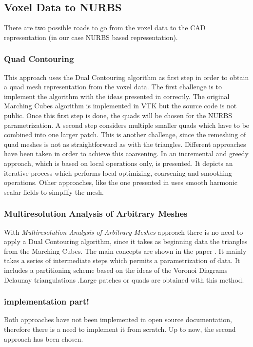 
\subsection{Voxel Data to NURBS}
There are two possible roads to go from the voxel data to the CAD representation (in our case NURBS based representation).
\subsubsection{Quad Contouring}
This approach uses the Dual Contouring algorithm as first step in order to obtain a quad mesh representation from the voxel data. The first challenge is to implement the algorithm with the ideas presented in \cite{Hermite2002} correctly. The original Marching Cubes algorithm is implemented in VTK but the source code is not public. Once this first step is done, the quads will be chosen for the NURBS parametrization. A second step considers multiple smaller quads which have to be combined into one larger patch. This is another challenge, since the remeshing of quad meshes is not as straightforward as with the triangles. Different approaches have been taken in order to achieve this coarsening. In \cite{Puppo2010} an incremental and greedy approach, which is based on local operations only, is presented. It depicts an iterative process which performs local optimizing, coarsening and smoothing operations. Other approaches, like the one presented in \cite{Dong2005} uses smooth harmonic scalar fields to simplify the mesh.



\subsubsection{Multiresolution Analysis of Arbitrary Meshes}
With \textit{Multiresolution Analysis of Arbitrary Meshes} approach there is no need to apply a Dual Contouring algorithm, since it takes as beginning data the triangles from the Marching Cubes. The main concepts are shown in the paper \cite{eck1996automatic}. It mainly takes a series of intermediate steps which permits a parametrization of data. It includes a partitioning scheme based on the ideas of the Voronoi Diagrams  Delaunay triangulations .Large patches or quads are obtained with this method. 


\subsubsection{implementation part!}
Both approaches have not been implemented in open source documentation, therefore there is a need to implement it from scratch. Up to now, the second approach has been chosen.
